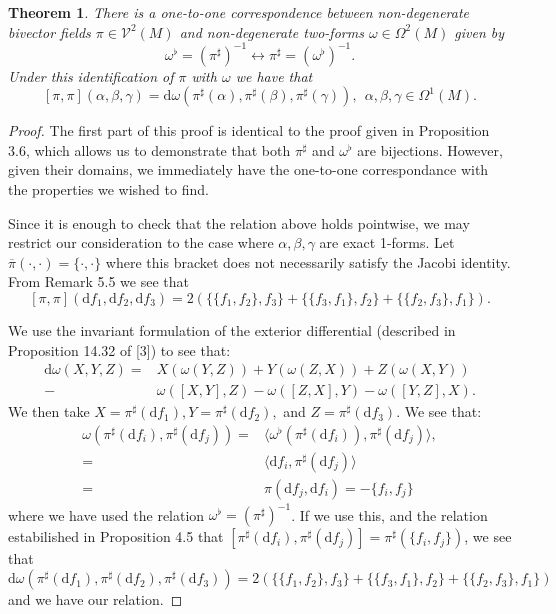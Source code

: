\documentclass[psamsfonts,12pt]{amsart}
\newcommand\td{\mathrm{d}}
\newcommand\0{\mathbf{0}}
\newcommand\inv{^{-1}}
\theoremstyle{plain}
\newtheorem{thm}{Theorem}[section] %
\theoremstyle{definition}
\newcommand{\sV}{\mathcal{V}}
\begin{document}
\begin{thm}
There is a one-to-one correspondence between non-degenerate bivector fields $\pi \in \sV^2(M)$ and non-degenerate two-forms $\omega \in \Omega^2(M)$ given by 
\[
\omega^\flat = (\pi^\sharp)\inv \longleftrightarrow \pi^\sharp=(\omega^\flat)\inv.
\]
Under this identification of $\pi$ with $\omega$ we have that
\[
[\pi,\pi](\alpha,\beta,\gamma)= \td \omega (\pi^\sharp(\alpha), \pi^\sharp(\beta), \pi^\sharp(\gamma)), \ \ \alpha, \beta,\gamma \in \Omega^1(M).
\]
\end{thm}
\begin{proof}
The first part of this proof is identical to the proof given in Proposition 3.6, which allows us to demonstrate that both $\pi^\sharp$ and $\omega^\flat$ are bijections.  However, given their domains, we immediately have the one-to-one correspondance with the properties we wished to find.

Since it is enough to check that the relation above holds pointwise, we may restrict our consideration to the case where $\alpha,\beta,\gamma$ are exact 1-forms.  Let $\overline{\pi}(\cdot, \cdot)=\{\cdot, \cdot\}$ where this bracket does not necessarily satisfy the Jacobi identity.  From Remark 5.5 we see that
\[
[\pi,\pi](\td f_1,\td f_2, \td f_3)=2\left(\{\{f_1,f_2\},f_3\}+\{\{f_3,f_1\},f_2\}+\{\{f_2,f_3\},f_1\}\right).
\]

We use the invariant formulation of the exterior differential (described in Proposition 14.32 of [3]) to see that:
\begin{align*}
\td \omega(X,Y,Z)=&X(\omega(Y,Z))+Y(\omega(Z,X))+Z(\omega(X,Y))\\
-& \omega([X,Y],Z) - \omega([Z,X],Y)-\omega([Y,Z],X).
\end{align*}
We then take $X=\pi^\sharp(\td f_1), Y=\pi^\sharp(\td f_2),$ and $Z=\pi^\sharp(\td f_3)$.  We see that:
\begin{align*}
\omega(\pi^\sharp(\td f_i), \pi^\sharp(\td f_j))=& \langle \omega^\flat(\pi^\sharp(\td f_i)), \pi^\sharp(\td f_j)\rangle,\\
=& \langle \td f_i , \pi^\sharp(\td f_j)\rangle\\
=& \pi(\td f_j, \td f_i)=-\{f_i,f_j\}
\end{align*}
where we have used the relation $\omega^\flat=(\pi^\sharp)\inv$.  If we use this, and the relation estabilished in Proposition 4.5 that $[\pi^\sharp(\td f_i),\pi^\sharp(\td f_j)]=\pi^\sharp(\{f_i,f_j\})$, we see that
\[
\td \omega(\pi^\sharp(\td f_1), \pi^\sharp(\td f_2), \pi^\sharp(\td f_3))=2\left(\{\{f_1,f_2\},f_3\}+\{\{f_3,f_1\},f_2\}+\{\{f_2,f_3\},f_1\}\right)
\]
and we have our relation.
\end{proof}
\end{document}
